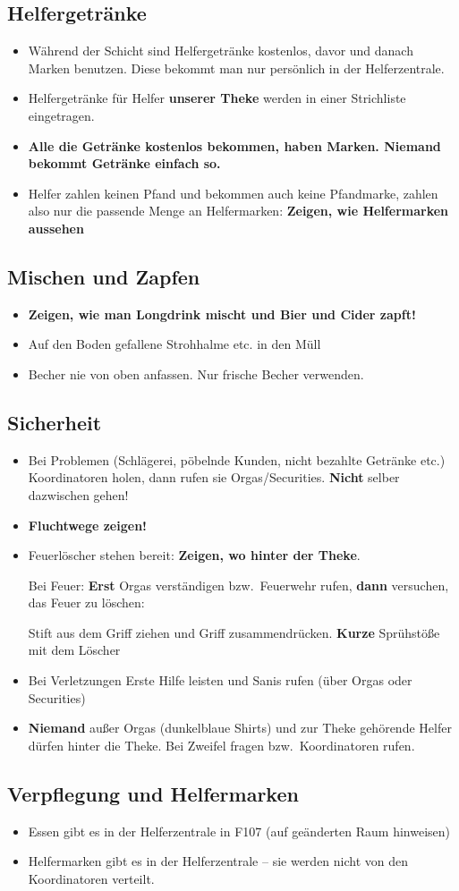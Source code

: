 \subsection{Helfergetränke}
\begin{itemize}
        \renewcommand{\labelitemi}{$\Box$}
    \item Während der Schicht sind Helfergetränke kostenlos, davor und danach Marken benutzen. Diese bekommt man nur persönlich in der Helferzentrale.
    \item Helfergetränke für Helfer \textbf{unserer Theke} werden in einer Strichliste eingetragen.
    \item \textbf{Alle die Getränke kostenlos bekommen, haben Marken. Niemand bekommt Getränke einfach so.}
    \item Helfer zahlen keinen Pfand und bekommen auch keine Pfandmarke, zahlen also nur die passende Menge an Helfermarken: \textbf{Zeigen, wie Helfermarken aussehen}
\end{itemize}
\subsection{Mischen und Zapfen}
\begin{itemize}
        \renewcommand{\labelitemi}{$\Box$}
    \item \textbf{Zeigen, wie man Longdrink mischt und Bier und Cider zapft!}
    \item Auf den Boden gefallene Strohhalme etc. in den Müll
    \item Becher nie von oben anfassen. Nur frische Becher verwenden.
\end{itemize}
\subsection{Sicherheit}
\begin{itemize}
        \renewcommand{\labelitemi}{$\Box$}
    \item Bei Problemen (Schlägerei, pöbelnde Kunden, nicht bezahlte Getränke etc.) Koordinatoren holen, dann rufen sie Orgas/Securities. \textbf{Nicht} selber dazwischen gehen!
    \item \textbf{Fluchtwege zeigen!}
    \item Feuerlöscher stehen bereit: \textbf{Zeigen, wo hinter der Theke}.

        Bei Feuer: \textbf{Erst} Orgas verständigen bzw.\ Feuerwehr rufen, \textbf{dann} versuchen, das Feuer zu löschen:

        Stift aus dem Griff ziehen und Griff zusammendrücken. \textbf{Kurze} Sprühstöße mit dem Löscher
    \item Bei Verletzungen Erste Hilfe leisten und Sanis rufen (über Orgas oder Securities)
    \item \textbf{Niemand} außer Orgas (dunkelblaue Shirts) und zur Theke gehörende Helfer dürfen hinter die Theke. Bei Zweifel fragen bzw.\ Koordinatoren rufen.
\end{itemize}
\subsection{Verpflegung und Helfermarken}
\begin{itemize}
    \item Essen gibt es in der Helferzentrale in F107 (auf geänderten Raum hinweisen)
    \item Helfermarken gibt es in der Helferzentrale -- sie werden nicht von den Koordinatoren verteilt.
\end{itemize}
